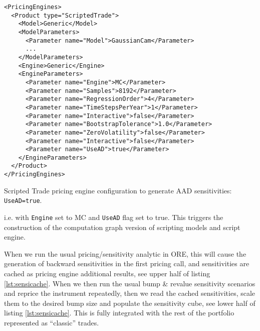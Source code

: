 \begin{listing}[hbt]
\begin{verbatim}
<PricingEngines>
  <Product type="ScriptedTrade">
    <Model>Generic</Model>
    <ModelParameters>
      <Parameter name="Model">GaussianCam</Parameter>
      ...
    </ModelParameters>
    <Engine>Generic</Engine>
    <EngineParameters>
      <Parameter name="Engine">MC</Parameter>
      <Parameter name="Samples">8192</Parameter>
      <Parameter name="RegressionOrder">4</Parameter>
      <Parameter name="TimeStepsPerYear">1</Parameter>
      <Parameter name="Interactive">false</Parameter>
      <Parameter name="BootstrapTolerance">1.0</Parameter>
      <Parameter name="ZeroVolatility">false</Parameter>
      <Parameter name="Interactive">false</Parameter>
      <Parameter name="UseAD">true</Parameter>
    </EngineParameters>
  </Product>
</PricingEngines>
\end{verbatim}
\caption{Scripted Trade pricing engine configuration to generate AAD sensitivities: {\tt UseAD=true}.}
\label{lst:pricingengineconfig_aad}
\end{listing}

i.e. with {\tt Engine} set to MC and {\tt UseAD} flag set to true.
This triggers the construction of the computation graph version of scripting models and script engine.

When we run the usual pricing/sensitivity analytic in ORE, this will cause the generation of
backward sensitivities in the first pricing call, and sensitivities are cached as pricing
engine additional results, see upper half of listing \ref{lst:sensicache}.
When we then run the usual bump \& revalue sensitivity scenarios and
reprice the instrument repeatedly, then we read the cached sensitivities, scale them to the
desired bump size and populate the sensitivity cube, see lower half of listing \ref{lst:sensicache}.
This is fully integrated with the rest of the portfolio represented as ``classic'' trades.

